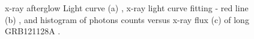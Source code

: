 \begin{figure}[hpbt]
\caption{x-ray  afterglow Light curve (a) , x-ray  light curve fitting - red line (b) , and histogram  of  photons counts  versus x-ray flux  (c)  of long GRB121128A .}
\end{figure}
